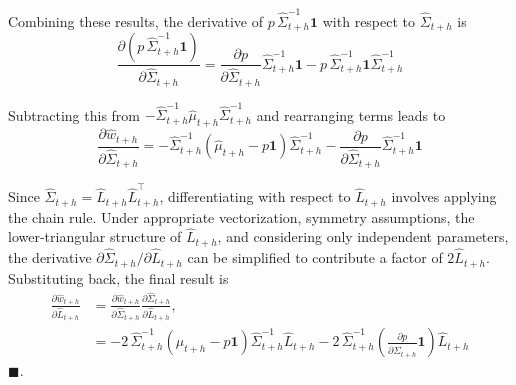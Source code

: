Combining these results, the derivative of $p\,\hat{\Sigma}_{t+h}^{-1}\mathbf{1}$ with respect to $\hat{\Sigma}_{t+h}$ is  
\begin{equation}
    \frac{\partial (p\,\hat{\Sigma}_{t+h}^{-1}\mathbf{1})}{\partial \hat{\Sigma}_{t+h}}
= \frac{\partial p}{\partial \hat{\Sigma}_{t+h}}\hat{\Sigma}_{t+h}^{-1}\mathbf{1} - p\,\hat{\Sigma}_{t+h}^{-1}\mathbf{1}\hat{\Sigma}_{t+h}^{-1}
\end{equation}

Subtracting this from $-\hat{\Sigma}_{t+h}^{-1}\hat{\mu}_{t+h}\hat{\Sigma}_{t+h}^{-1}$ and rearranging terms leads to  
\begin{equation}
    \frac{\partial \hat{w}_{t+h}}{\partial \hat{\Sigma}_{t+h}}
= -\hat{\Sigma}_{t+h}^{-1}(\hat{\mu}_{t+h}-p\mathbf{1})\hat{\Sigma}_{t+h}^{-1} - \frac{\partial p}{\partial \hat{\Sigma}_{t+h}}\hat{\Sigma}_{t+h}^{-1}\mathbf{1}
\end{equation}

Since $\hat{\Sigma}_{t+h} = \hat{L}_{t+h}\hat{L}_{t+h}^{\top}$, differentiating with respect to $\hat{L}_{t+h}$ involves applying the chain rule. Under appropriate vectorization, symmetry assumptions, the lower-triangular structure of $\hat{L}_{t+h}$, and considering only independent parameters, the derivative $\partial \hat{\Sigma}_{t+h}/\partial \hat{L}_{t+h}$ can be simplified to contribute a factor of $2\hat{L}_{t+h}$. Substituting back, the final result is  
\begin{equation}
\begin{aligned}
\frac{\partial \hat{w}_{t+h}}{\partial \hat{L}_{t+h}} 
&= \frac{\partial \hat{w}_{t+h}}{\partial \hat{\Sigma}_{t+h}}\frac{\partial \hat{\Sigma}_{t+h}}{\partial \hat{L}_{t+h}}, \\
&= -2\,\hat{\Sigma}_{t+h}^{-1}(\hat{\mu}_{t+h}-p\mathbf{1})\hat{\Sigma}_{t+h}^{-1}\hat{L}_{t+h} 
- 2\,\hat{\Sigma}_{t+h}^{-1}\left(\frac{\partial p}{\partial \hat{\Sigma}_{t+h}}\mathbf{1}\right)\hat{L}_{t+h}
\end{aligned}
\end{equation} $\blacksquare$.


